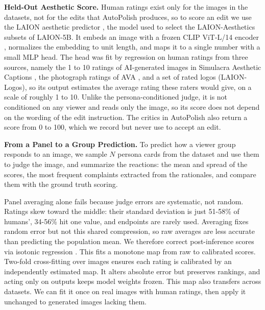 \documentclass[runningheads]{llncs}
\begin{document}
\textbf{Held-Out Aesthetic Score.} Human ratings exist only for the images in the datasets, not for the edits that AutoPolish produces, so to score an edit we use the LAION aesthetic predictor \cite{schuhmann2022, schuhmann2022predictor}, the model used to select the LAION-Aesthetics subsets of LAION-5B. It embeds an image with a frozen CLIP ViT-L/14 encoder \cite{radford2021}, normalizes the embedding to unit length, and maps it to a single number with a small MLP head. The head was fit by regression on human ratings from three sources, namely the 1 to 10 ratings of AI-generated images in Simulacra Aesthetic Captions \cite{pressman2022sac}, the photograph ratings of AVA \cite{murray2012ava}, and a set of rated logos (LAION-Logos), so its output estimates the average rating these raters would give, on a scale of roughly 1 to 10. Unlike the persona-conditioned judge, it is not conditioned on any viewer and reads only the image, so its score does not depend on the wording of the edit instruction. The critics in AutoPolish also return a score from 0 to 100, which we record but never use to accept an edit.

\textbf{From a Panel to a Group Prediction.} To predict how a viewer group responds to an image, we sample $N$ persona cards from the dataset and use them to judge the image, and summarize the reactions: the mean and spread of the scores, the most frequent complaints extracted from the rationales, and compare them with the ground truth scoring.

Panel averaging alone fails because judge errors are systematic, not random. Ratings skew toward the middle: their standard deviation is just 51-58\% of humans', 34-56\% hit one value, and endpoints are rarely used. Averaging fixes random error but not this shared compression, so raw averages are less accurate than predicting the population mean. We therefore correct post-inference scores via isotonic regression \cite{niculescu2005}. This fits a monotone map from raw to calibrated scores. Two-fold cross-fitting over images ensures each rating is calibrated by an independently estimated map. It alters absolute error but preserves rankings, and acting only on outputs keeps model weights frozen. This map also transfers across datasets. We can fit it once on real images with human ratings, then apply it unchanged to generated images lacking them.
\end{document}
